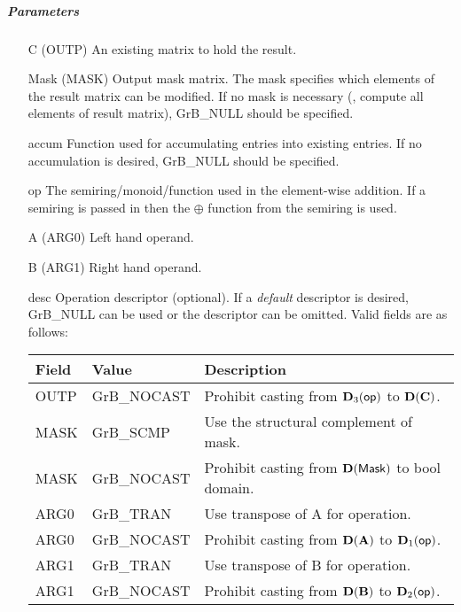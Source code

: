 \subparagraph{Parameters}

\begin{itemize}[leftmargin=1.1in]
    \item[{\sf C}]     ({\sf OUTP}) An existing matrix to hold the result.

    \item[{\sf Mask}] ({\sf MASK}) Output mask matrix. The mask
    specifies which elements of the result matrix can be modified.
    If no mask is necessary (\ie, compute all elements of result
    matrix), {\sf GrB\_NULL} should be specified.

    \item[{\sf accum}]  Function used for accumulating entries into existing
                         entries. If no accumulation is desired,
                        {\sf GrB\_NULL} should be specified.

    \item[{\sf op}]    The semiring/monoid/function used in the element-wise addition.
                       If a semiring is passed in then the $\oplus$ function from
                                    the semiring is used.
    \item[{\sf A}]     ({\sf ARG0}) Left hand operand.
    \item[{\sf B}]     ({\sf ARG1}) Right hand operand.
    
    \item[{\sf desc}]  Operation descriptor (optional). If a
    \emph{default} descriptor is desired, {\sf GrB\_NULL} can be
    used or the descriptor can be omitted. Valid fields are as follows: \\
    \begin{tabular}{lll}
        Field  & Value & Description \\
        \hline
        {\sf OUTP} & {\sf GrB\_NOCAST} & Prohibit casting from $\bold{D}_3({\sf op})$ to $\bold{D}({\bf C})$. \\
        {\sf MASK} & {\sf GrB\_SCMP} & Use the structural complement of {\sf mask}. \\
    {\sf MASK} & {\sf GrB\_NOCAST} & Prohibit casting from $\bold{D}({\sf Mask})$ to {\sf bool} domain. \\
    {\sf ARG0} & {\sf GrB\_TRAN} & Use transpose of {\sf A} for operation. \\
        {\sf ARG0} & {\sf GrB\_NOCAST} & Prohibit casting from $\bold{D}({\bf A})$ to $\bold{D}_1({\sf op})$. \\
    {\sf ARG1} & {\sf GrB\_TRAN} & Use transpose of {\sf B} for operation. \\
        {\sf ARG1} & {\sf GrB\_NOCAST} & Prohibit casting from $\bold{D}({\bf B})$ to $\bold{D}_2({\sf op})$. \\
    \end{tabular}
\end{itemize}

